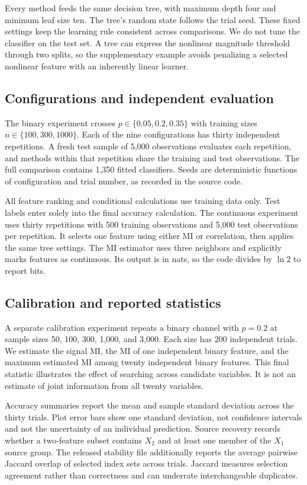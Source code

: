 \documentclass[journal,11pt]{IEEEtran}
\begin{document}
Every method feeds the same decision tree, with maximum depth four and minimum leaf size ten. The tree's random state follows the trial seed. These fixed settings keep the learning rule consistent across comparisons. We do not tune the classifier on the test set. A tree can express the nonlinear magnitude threshold through two splits, so the supplementary example avoids penalizing a selected nonlinear feature with an inherently linear learner.

\subsection{Configurations and independent evaluation}
The binary experiment crosses $p\in\{0.05,0.2,0.35\}$ with training sizes $n\in\{100,300,1000\}$. Each of the nine configurations has thirty independent repetitions. A fresh test sample of 5,000 observations evaluates each repetition, and methods within that repetition share the training and test observations. The full comparison contains 1,350 fitted classifiers. Seeds are deterministic functions of configuration and trial number, as recorded in the source code.

All feature ranking and conditional calculations use training data only. Test labels enter solely into the final accuracy calculation. The continuous experiment uses thirty repetitions with 500 training observations and 5,000 test observations per repetition. It selects one feature using either MI or correlation, then applies the same tree settings. The MI estimator uses three neighbors and explicitly marks features as continuous. Its output is in nats, so the code divides by $\ln 2$ to report bits.

\subsection{Calibration and reported statistics}
A separate calibration experiment repeats a binary channel with $p=0.2$ at sample sizes 50, 100, 300, 1,000, and 3,000. Each size has 200 independent trials. We estimate the signal MI, the MI of one independent binary feature, and the maximum estimated MI among twenty independent binary features. This final statistic illustrates the effect of searching across candidate variables. It is not an estimate of joint information from all twenty variables.

Accuracy summaries report the mean and sample standard deviation across the thirty trials. Plot error bars show one standard deviation, not confidence intervals and not the uncertainty of an individual prediction. Source recovery records whether a two-feature subset contains $X_2$ and at least one member of the $X_1$ source group. The released stability file additionally reports the average pairwise Jaccard overlap of selected index sets across trials. Jaccard measures selection agreement rather than correctness and can underrate interchangeable duplicates.
\end{document}

